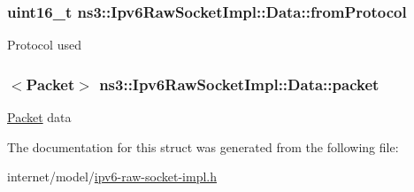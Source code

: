 \subsubsection[{\texorpdfstring{from\+Protocol}{fromProtocol}}]{\setlength{\rightskip}{0pt plus 5cm}uint16\+\_\+t ns3\+::\+Ipv6\+Raw\+Socket\+Impl\+::\+Data\+::from\+Protocol}\hypertarget{structns3_1_1Ipv6RawSocketImpl_1_1Data_a8a576c6fc65cd170c6d67fdf83b15086}{}\label{structns3_1_1Ipv6RawSocketImpl_1_1Data_a8a576c6fc65cd170c6d67fdf83b15086}
Protocol used 
\subsubsection[{\texorpdfstring{packet}{packet}}]{$<${\bf Packet}$>$ ns3\+::\+Ipv6\+Raw\+Socket\+Impl\+::\+Data\+::packet}\hypertarget{structns3_1_1Ipv6RawSocketImpl_1_1Data_a854e11b87ad90adab5b6b7928278803f}{}\label{structns3_1_1Ipv6RawSocketImpl_1_1Data_a854e11b87ad90adab5b6b7928278803f}
\hyperlink{classns3_1_1Packet}{Packet} data 

The documentation for this struct was generated from the following file\+:\begin{DoxyCompactItemize}
\item 
internet/model/\hyperlink{ipv6-raw-socket-impl_8h}{ipv6-\/raw-\/socket-\/impl.\+h}\end{DoxyCompactItemize}

